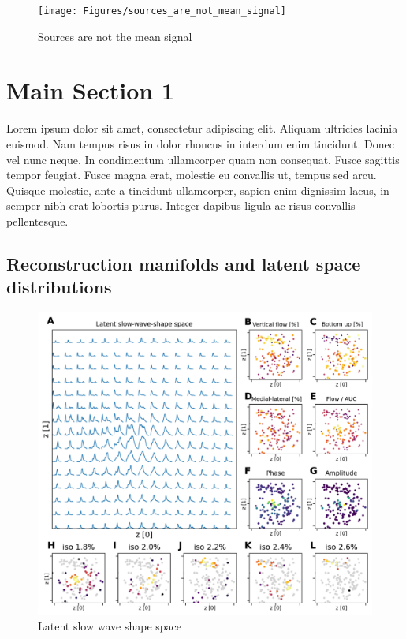 \begin{figure}[!htb]
\centering
\texttt{[image: Figures/sources\_are\_not\_mean\_signal]}
\decoRule
\caption[Sources are not the mean signal]{Sources are not the mean signal}
\label{fig:sources_are_not_mean_signal}
\end{figure}


\section{Main Section 1}

Lorem ipsum dolor sit amet, consectetur adipiscing elit. Aliquam ultricies lacinia euismod. Nam tempus risus in dolor rhoncus in interdum enim tincidunt. Donec vel nunc neque. In condimentum ullamcorper quam non consequat. Fusce sagittis tempor feugiat. Fusce magna erat, molestie eu convallis ut, tempus sed arcu. Quisque molestie, ante a tincidunt ullamcorper, sapien enim dignissim lacus, in semper nibh erat lobortis purus. Integer dapibus ligula ac risus convallis pellentesque.

\subsection{Reconstruction manifolds and latent space distributions}

\begin{figure}[!htb]
\centering
\includegraphics[width=\textwidth,height=\textheight,keepaspectratio]{Figures/slow_wave_shape_space}
\decoRule
\caption[Latent slow wave shape space]{Latent slow wave shape space}
\label{fig:slow_wave_shape_space}
\end{figure}


